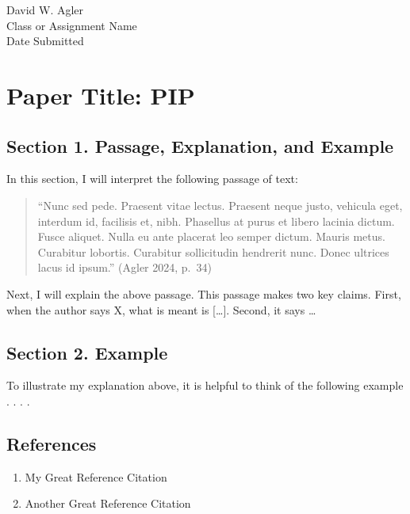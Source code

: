 David W. Agler\\
Class or Assignment Name\\
Date Submitted

\section{Paper Title: PIP}\label{paper-title-pip}

\subsection{Section 1. Passage, Explanation, and
Example}\label{section-1.-passage-explanation-and-example}

In this section, I will interpret the following passage of text:

\begin{quote}
``Nunc sed pede. Praesent vitae lectus. Praesent neque justo, vehicula
eget, interdum id, facilisis et, nibh. Phasellus at purus et libero
lacinia dictum. Fusce aliquet. Nulla eu ante placerat leo semper dictum.
Mauris metus. Curabitur lobortis. Curabitur sollicitudin hendrerit nunc.
Donec ultrices lacus id ipsum.'' (Agler 2024, p.~34)
\end{quote}

Next, I will explain the above passage. This passage makes two key
claims. First, when the author says X, what is meant is {[}\ldots{]}.
Second, it says \ldots{}

\subsection{Section 2. Example}\label{section-2.-example}

To illustrate my explanation above, it is helpful to think of the
following example . . . .

\subsection{References}\label{references}

\begin{enumerate}
\def\labelenumi{\arabic{enumi}.}
\tightlist
\item
  My Great Reference Citation
\item
  Another Great Reference Citation
\end{enumerate}
